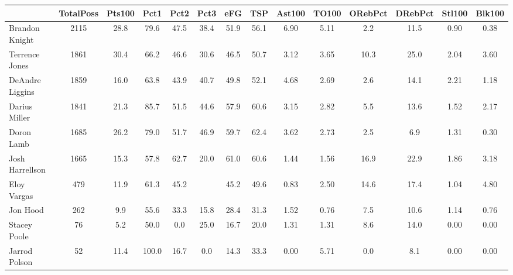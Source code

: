 \documentclass[10pt]{article}
\begin{document}
\begin{table}[ht]
\begin{center}
\begin{tabular}{lccccccccccccc}
  \hline
 & TotalPoss & Pts100 & Pct1 & Pct2 & Pct3 & eFG & TSP & Ast100 & TO100 & ORebPct & DRebPct & Stl100 & Blk100 \\ 
  \hline
Brandon Knight & 2115 & 28.8 & 79.6 & 47.5 & 38.4 & 51.9 & 56.1 & 6.90 & 5.11 & 2.2 & 11.5 & 0.90 & 0.38 \\ 
  Terrence Jones & 1861 & 30.4 & 66.2 & 46.6 & 30.6 & 46.5 & 50.7 & 3.12 & 3.65 & 10.3 & 25.0 & 2.04 & 3.60 \\ 
  DeAndre Liggins & 1859 & 16.0 & 63.8 & 43.9 & 40.7 & 49.8 & 52.1 & 4.68 & 2.69 & 2.6 & 14.1 & 2.21 & 1.18 \\ 
  Darius Miller & 1841 & 21.3 & 85.7 & 51.5 & 44.6 & 57.9 & 60.6 & 3.15 & 2.82 & 5.5 & 13.6 & 1.52 & 2.17 \\ 
  Doron Lamb & 1685 & 26.2 & 79.0 & 51.7 & 46.9 & 59.7 & 62.4 & 3.62 & 2.73 & 2.5 & 6.9 & 1.31 & 0.30 \\ 
  Josh Harrellson & 1665 & 15.3 & 57.8 & 62.7 & 20.0 & 61.0 & 60.6 & 1.44 & 1.56 & 16.9 & 22.9 & 1.86 & 3.18 \\ 
  Eloy Vargas & 479 & 11.9 & 61.3 & 45.2 &  & 45.2 & 49.6 & 0.83 & 2.50 & 14.6 & 17.4 & 1.04 & 4.80 \\ 
  Jon Hood & 262 & 9.9 & 55.6 & 33.3 & 15.8 & 28.4 & 31.3 & 1.52 & 0.76 & 7.5 & 10.6 & 1.14 & 0.76 \\ 
  Stacey Poole & 76 & 5.2 & 50.0 & 0.0 & 25.0 & 16.7 & 20.0 & 1.31 & 1.31 & 8.6 & 14.0 & 0.00 & 0.00 \\ 
  Jarrod Polson & 52 & 11.4 & 100.0 & 16.7 & 0.0 & 14.3 & 33.3 & 0.00 & 5.71 & 0.0 & 8.1 & 0.00 & 0.00 \\ 
   \hline
\end{tabular}
\end{center}
\end{table}
\end{document}
